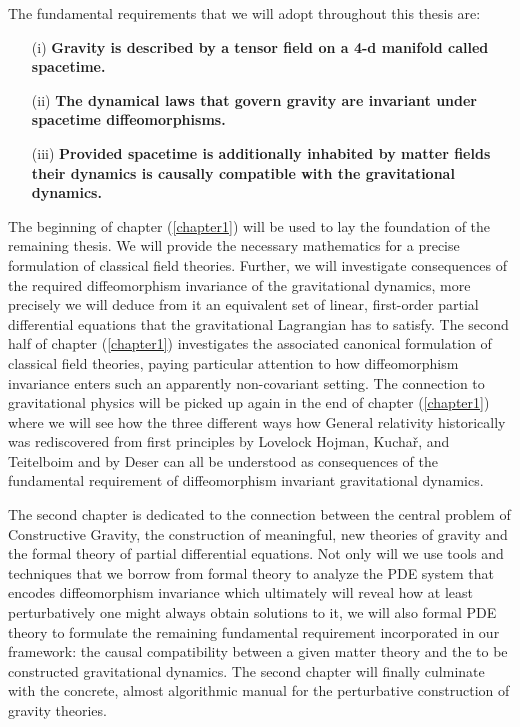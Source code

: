 \documentclass[a4paper,12pt, DIV=14, BCOR=5mm, twoside, headsepline, numbers=noenddot]{scrbook}
\begin{document}
The fundamental requirements that we will adopt throughout this thesis are:
\begin{itemize}
    \item[(i)] \textbf{Gravity is described by a tensor field on a 4-d manifold called spacetime.}
    \item[(ii)] \textbf{The dynamical laws that govern gravity are invariant under spacetime diffeomorphisms.}
    \item[(iii)] \textbf{Provided spacetime is additionally inhabited by matter fields their dynamics is causally compatible with the gravitational dynamics.}
\end{itemize}

The beginning of chapter (\ref{chapter1}) will be used to lay the foundation of the remaining thesis. We will provide the necessary mathematics for a precise formulation of classical field theories. Further, we will investigate consequences of the required diffeomorphism invariance of the gravitational dynamics, more precisely we will deduce from it an equivalent set of linear, first-order partial differential equations that the gravitational Lagrangian has to satisfy. The second half of chapter (\ref{chapter1}) investigates the associated canonical formulation of classical field theories, paying particular attention to how diffeomorphism invariance enters such an apparently non-covariant setting. The connection to gravitational physics will be picked up again in the end of chapter (\ref{chapter1}) where we will see how the three different ways how General relativity historically was rediscovered from first principles by Lovelock \cite{doi:10.1063/1.1665613} Hojman, Kuchař, and Teitelboim \cite{HOJMAN197688} and by Deser \cite{1970GReGr...1....9D} can all be understood as consequences of the fundamental requirement of diffeomorphism invariant gravitational dynamics.

The second chapter is dedicated to the connection between the central problem of Constructive Gravity, the construction of meaningful, new theories of gravity and the formal theory of partial differential equations. Not only will we use tools and techniques that we borrow from formal theory to analyze the PDE system that encodes diffeomorphism invariance which ultimately will reveal how at least perturbatively one might always obtain solutions to it, we will also formal PDE theory to formulate the remaining fundamental requirement incorporated in our framework: the causal compatibility between a given matter theory and the to be constructed gravitational dynamics. The second chapter will finally culminate with the concrete, almost algorithmic manual for the perturbative construction of gravity theories.  
\end{document}
